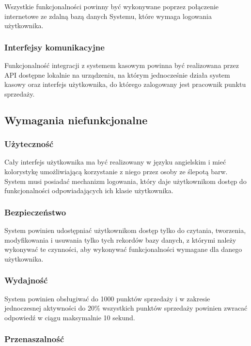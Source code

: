\documentclass[a4paper,12pt]{article}
\begin{document}
Wszystkie funkcjonalności powinny być wykonywane poprzez połączenie internetowe ze zdalną bazą danych Systemu, które wymaga logowania użytkownika.

\subsubsection{Interfejsy komunikacyjne}

Funkcjonalność integracji z systemem kasowym powinna być realizowana przez API dostępne lokalnie na urządzeniu, na którym jednocześnie działa system kasowy oraz interfejs użytkownika, do którego zalogowany jest pracownik punktu sprzedaży. 

\subsection{Wymagania niefunkcjonalne}

\subsubsection{Użyteczność}

Cały interfejs użytkownika ma być realizowany w języku angielskim i mieć kolorystykę umożliwiającą korzystanie z niego przez osoby ze ślepotą barw.
System musi posiadać mechanizm logowania, który daje użytkownikom dostęp do funkcjonalności odpowiadających ich klasie użytkownika.

\subsubsection{Bezpieczeństwo}

System powinien udostępniać użytkownikom dostęp tylko do czytania, tworzenia, modyfikowania i usuwania tylko tych rekordów bazy danych, z którymi należy wykonywać te czynności, aby wykonywać funkcjonalności wymagane dla danego użytkownika.

\subsubsection{Wydajność}

System powinien obsługiwać do 1000 punktów sprzedaży i w zakresie jednoczesnej aktywności do 20\% wszystkich punktów sprzedaży powinien zwracać odpowiedź w ciągu maksymalnie 10 sekund.

\subsubsection{Przenaszalność}
\end{document}
